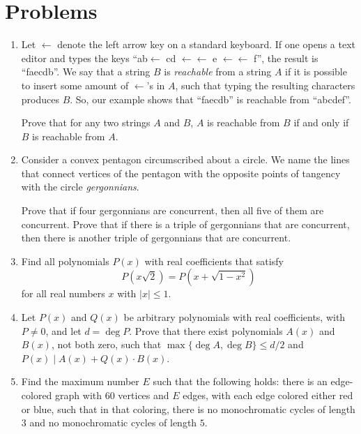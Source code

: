 \documentclass[11pt]{scrartcl}
\begin{document}
\section{Problems}
\begin{enumerate}[\bfseries 1.]
\item %
Let $\leftarrow$ denote the left arrow key on a standard keyboard. If
one opens a text editor and types the keys
``ab$\leftarrow$ cd $\leftarrow \leftarrow$ e $\leftarrow \leftarrow$ f'',
the result is ``faecdb''.
We say that a string $B$ is \emph{reachable} from a string $A$ if
it is possible to insert some amount of $\leftarrow$'s in $A$,
such that typing the resulting characters produces $B$.
So, our example shows that ``faecdb'' is reachable from ``abcdef''.

Prove that for any two strings $A$ and $B$,
$A$ is reachable from $B$ if and only if $B$ is reachable from $A$.

\item %
Consider a convex pentagon circumscribed about a circle.
We name the lines that connect vertices of the pentagon with
the opposite points of tangency with the circle \emph{gergonnians}.
\begin{enumerate}
  \ii[(a)] Prove that if four gergonnians are concurrent,
    then all five of them are concurrent.
  \ii[(b)] Prove that if there is a triple of gergonnians
    that are concurrent, then there is another triple
    of gergonnians that are concurrent.
\end{enumerate}

\item %
Find all polynomials $P(x)$ with real coefficients that satisfy
\[ P(x \sqrt 2) = P(x + \sqrt{1-x^2}) \]
for all real numbers $x$ with $\lvert x \rvert \le 1$.

\item %
Let $P(x)$ and $Q(x)$ be arbitrary polynomials with real coefficients,
with $P \neq 0$, and let $d = \deg P$.
Prove that there exist polynomials $A(x)$ and $B(x)$,
not both zero, such that $\max \{ \deg A, \deg B \} \le d/2$
and $P(x) \mid A(x) + Q(x) \cdot B(x)$.

\item %
Find the maximum number $E$ such that the following holds:
there is an edge-colored graph with $60$ vertices and $E$ edges,
with each edge colored either red or blue, such that in that coloring,
there is no monochromatic cycles of length $3$
and no monochromatic cycles of length $5$.


\end{enumerate}
\end{document}
